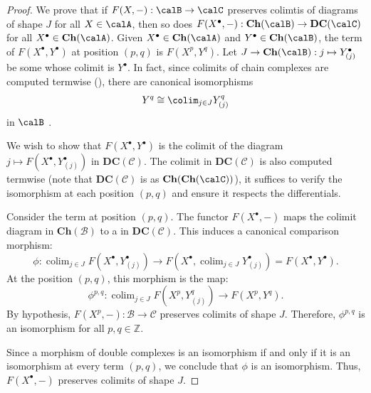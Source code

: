 \begin{proof}
    We prove that if $F(X,-): \calB \to \calC$ preserves colimtis of diagrams of shape $J$ for all $X \in \calA$, then so does $F(X^\bullet, -): \mathbf{Ch}(\calB) \to \mathbf{DC}(\calC)$ for all $X^\bullet \in \mathbf{Ch}(\calA)$. Given $X^\bullet \in \mathbf{Ch}(\calA)$ and $Y^\bullet \in \mathbf{Ch}(\calB)$, the term of $F(X^\bullet, Y^\bullet)$ at position $(p,q)$ is $F(X^p, Y^q)$. Let $J \to \mathbf{Ch}(\calB): j \mapsto Y_{(j)}^\bullet$ be some  whose colimit is $Y^\bullet$. In fact, since colimits of chain complexes are computed termwise (), there are canonical isomorphisms
    $$Y^q \cong \colim_{j \in J} Y_{(j)}^q $$
    in $\calB$ .

    We wish to show that $F(X^\bullet, Y^\bullet)$ is the colimit of the diagram $j \mapsto F(X^\bullet, Y_{(j)}^\bullet)$ in $\mathbf{DC}(\mathcal{C})$. The colimit in $\mathbf{DC}(\mathcal{C})$ is also computed termwise (note that $\mathbf{DC}(\mathcal{C})$ is  as $\mathbf{Ch}(\mathbf{Ch}(\calC))$), it suffices to verify the isomorphism at each position $(p,q)$ and ensure it respects the differentials.

    Consider the term at position $(p,q)$. The functor $F(X^\bullet, -)$ maps the colimit diagram in $\mathbf{Ch}(\mathcal{B})$ to a  in $\mathbf{DC}(\mathcal{C})$. This induces a canonical comparison morphism:
    \[ \phi: \operatorname{colim}_{j \in J} F(X^\bullet, Y_{(j)}^\bullet) \longrightarrow F(X^\bullet, \operatorname{colim}_{j \in J} Y_{(j)}^\bullet) = F(X^\bullet, Y^\bullet). \]
    At the position $(p,q)$, this morphism is the map:
    \[ \phi^{p,q}: \operatorname{colim}_{j \in J} F(X^p, Y_{(j)}^q) \longrightarrow F(X^p, Y^q). \]
    By hypothesis, $F(X^p, -): \mathcal{B} \to \mathcal{C}$ preserves colimits of shape $J$. Therefore, $\phi^{p,q}$ is an isomorphism for all $p,q \in \mathbb{Z}$.
    
    Since a morphism of double complexes is an isomorphism if and only if it is an isomorphism at every term $(p,q)$, we conclude that $\phi$ is an isomorphism. Thus, $F(X^\bullet, -)$ preserves colimits of shape $J$.
    
\end{proof}
